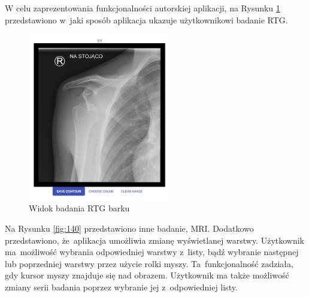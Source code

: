 \documentclass[a4paper,11pt,twoside,openright]{report}
\theoremstyle{definition}
\begin{document}
W celu zaprezentowania funkcjonalności autorskiej aplikacji, na Rysunku \ref{fig:113}
przedstawiono w~jaki sposób aplikacja ukazuje
użytkownikowi badanie RTG.

\begin{figure}[h!]
	\center
	\includegraphics[width=0.55\textwidth]{113}
	\caption{Widok badania RTG barku}
    	\label{fig:113}
\end{figure}

Na Rysunku \ref{fig:140} przedstawiono inne badanie, MRI. Dodatkowo przedstawiono,
że~aplikacja umożliwia zmianę wyświetlanej warstwy. Użytkownik ma~możliwość wybrania
odpowiedniej warstwy z~listy, bądź wybranie następnej lub poprzedniej warstwy przez użycie
rolki myszy. Ta~funkcjonalność zadziała, gdy kursor myszy znajduje się nad obrazem.
Użytkownik ma także możliwość zmiany serii badania poprzez wybranie jej z~odpowiedniej listy.

\bigskip
\end{document}
